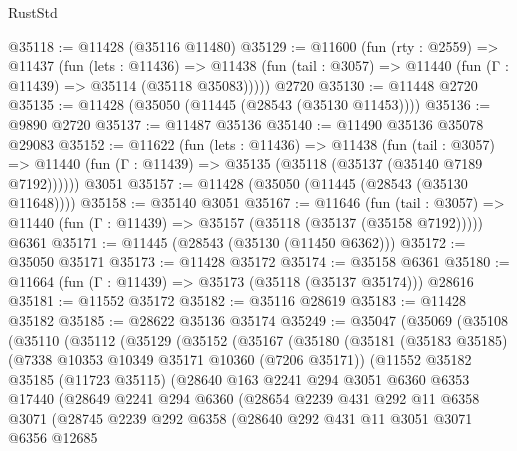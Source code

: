 \begin{lexlean}{RustStd}
\begin{coremodule}
@35118 := @11428 (@35116 @11480)
@35129 := @11600
    (fun (rty : @2559) =>
    @11437
      (fun (lets : @11436) =>
      @11438 (fun (tail : @3057) => @11440 (fun (Γ : @11439) => @35114 (@35118 @35083)))))
    @2720
@35130 := @11448 @2720
@35135 := @11428 (@35050 (@11445 (@28543 (@35130 @11453))))
@35136 := @9890 @2720
@35137 := @11487 @35136
@35140 := @11490 @35136 @35078 @29083
@35152 := @11622
    (fun (lets : @11436) =>
    @11438
      (fun (tail : @3057) =>
      @11440 (fun (Γ : @11439) => @35135 (@35118 (@35137 (@35140 @7189 @7192))))))
    @3051
@35157 := @11428 (@35050 (@11445 (@28543 (@35130 @11648))))
@35158 := @35140 @3051
@35167 := @11646
    (fun (tail : @3057) => @11440 (fun (Γ : @11439) => @35157 (@35118 (@35137 (@35158 @7192)))))
    @6361
@35171 := @11445 (@28543 (@35130 (@11450 @6362)))
@35172 := @35050 @35171
@35173 := @11428 @35172
@35174 := @35158 @6361
@35180 := @11664 (fun (Γ : @11439) => @35173 (@35118 (@35137 @35174))) @28616
@35181 := @11552 @35172
@35182 := @35116 @28619
@35183 := @11428 @35182
@35185 := @28622 @35136 @35174
@35249 := @35047
    (@35069
      (@35108
        (@35110
          (@35112
            (@35129
              (@35152
                (@35167
                  (@35180
                    (@35181
                      (@35183 @35185)
                      (@7338 @10353 @10349 @35171 @10360 (@7206 @35171))
                      (@11552
                        @35182
                        @35185
                        (@11723 @35115)
                        (@28640
                          @163
                          @2241
                          @294
                          @3051
                          @6360
                          @6353
                          @17440
                          (@28649
                            @2241
                            @294
                            @6360
                            (@28654
                              @2239
                              @431
                              @292
                              @11
                              @6358
                              @3071
                              (@28745
                                @2239
                                @292
                                @6358
                                (@28640
                                  @292
                                  @431
                                  @11
                                  @3051
                                  @3071
                                  @6356
                                  @12685

\end{coremodule}
\end{lexlean}
